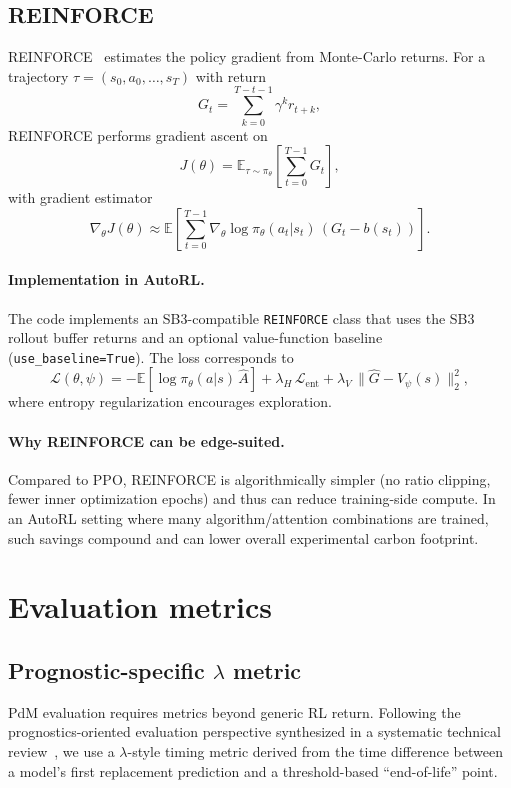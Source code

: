 \documentclass[11pt]{article}
\begin{document}
\subsection{\textsc{REINFORCE}}
\textsc{REINFORCE}~\cite{Williams1992REINFORCE} estimates the policy gradient from Monte-Carlo returns. For a trajectory $\tau=(s_0,a_0,\dots,s_T)$ with return
\begin{equation}
  G_t = \sum_{k=0}^{T-t-1}\gamma^k r_{t+k},
\end{equation}
REINFORCE performs gradient ascent on
\begin{equation}
  J(\theta) = \mathbb{E}_{\tau\sim \pi_\theta}\left[\sum_{t=0}^{T-1} G_t\right],
\end{equation}
with gradient estimator
\begin{equation}
  \nabla_\theta J(\theta) \approx \mathbb{E}\left[\sum_{t=0}^{T-1} \nabla_\theta \log \pi_\theta(a_t|s_t)\, (G_t - b(s_t))\right].
\end{equation}

\paragraph{Implementation in AutoRL.}
The code implements an SB3-compatible \texttt{REINFORCE} class that uses the SB3 rollout buffer returns and an optional value-function baseline (\texttt{use\_baseline=True}). The loss corresponds to
\begin{equation}
  \mathcal{L}(\theta,\psi)= -\mathbb{E}[\log\pi_\theta(a|s)\,\hat{A}] + \lambda_H\,\mathcal{L}_{\text{ent}} + \lambda_V\,\lVert \hat{G} - V_\psi(s)\rVert_2^2,
\end{equation}
where entropy regularization encourages exploration.

\paragraph{Why \textsc{REINFORCE} can be edge-suited.}
Compared to PPO, REINFORCE is algorithmically simpler (no ratio clipping, fewer inner optimization epochs) and thus can reduce training-side compute. In an AutoRL setting where many algorithm/attention combinations are trained, such savings compound and can lower overall experimental carbon footprint.

\section{Evaluation metrics}
\subsection{Prognostic-specific $\lambda$ metric}
PdM evaluation requires metrics beyond generic RL return. Following the prognostics-oriented evaluation perspective synthesized in a systematic technical review~\cite{RLforPdMReview2023}, we use a $\lambda$-style timing metric derived from the time difference between a model's first replacement prediction and a threshold-based ``end-of-life'' point.
\end{document}
